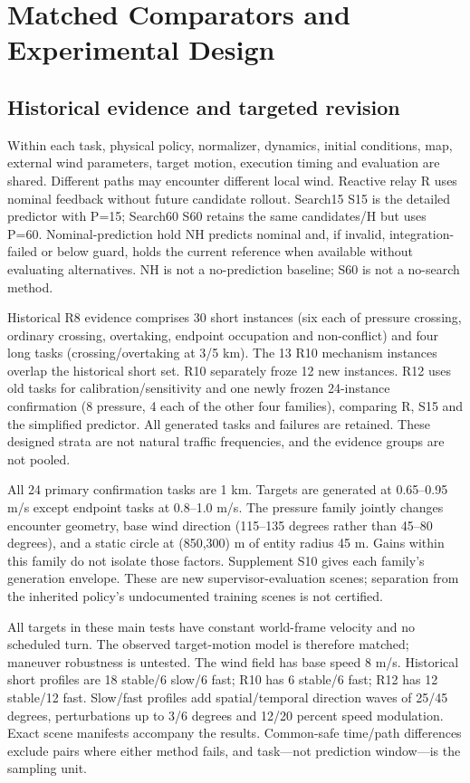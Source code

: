 \documentclass[conference]{IEEEtran}
\begin{document}
\section{Matched Comparators and Experimental Design}

\subsection{Historical evidence and targeted revision}

Within each task, physical policy, normalizer, dynamics, initial conditions, map, external wind parameters, target motion, execution timing and evaluation are shared. Different paths may encounter different local wind. Reactive relay R uses nominal feedback without future candidate rollout. Search15 S15 is the detailed predictor with P=15; Search60 S60 retains the same candidates/H but uses P=60. Nominal-prediction hold NH predicts nominal and, if invalid, integration-failed or below guard, holds the current reference when available without evaluating alternatives. NH is not a no-prediction baseline; S60 is not a no-search method.

Historical R8 evidence comprises 30 short instances (six each of pressure crossing, ordinary crossing, overtaking, endpoint occupation and non-conflict) and four long tasks (crossing/overtaking at 3/5 km). The 13 R10 mechanism instances overlap the historical short set. R10 separately froze 12 new instances. R12 uses old tasks for calibration/sensitivity and one newly frozen 24-instance confirmation (8 pressure, 4 each of the other four families), comparing R, S15 and the simplified predictor. All generated tasks and failures are retained. These designed strata are not natural traffic frequencies, and the evidence groups are not pooled.

All 24 primary confirmation tasks are 1 km. Targets are generated at 0.65--0.95 m/s except endpoint tasks at 0.8--1.0 m/s. The pressure family jointly changes encounter geometry, base wind direction (115--135 degrees rather than 45--80 degrees), and a static circle at (850,300) m of entity radius 45 m. Gains within this family do not isolate those factors. Supplement S10 gives each family's generation envelope. These are new supervisor-evaluation scenes; separation from the inherited policy's undocumented training scenes is not certified.

All targets in these main tests have constant world-frame velocity and no scheduled turn. The observed target-motion model is therefore matched; maneuver robustness is untested. The wind field has base speed 8 m/s. Historical short profiles are 18 stable/6 slow/6 fast; R10 has 6 stable/6 fast; R12 has 12 stable/12 fast. Slow/fast profiles add spatial/temporal direction waves of 25/45 degrees, perturbations up to 3/6 degrees and 12/20 percent speed modulation. Exact scene manifests accompany the results. Common-safe time/path differences exclude pairs where either method fails, and task---not prediction window---is the sampling unit.
\end{document}
